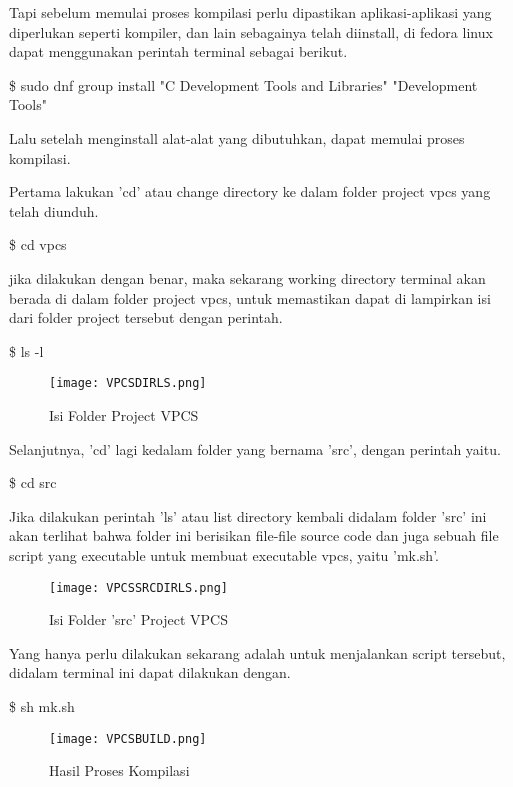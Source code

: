 \documentclass[12pt, a4paper]{article}
\begin{document}
\begin{enumerate}[label=\arabic*.]
          Tapi sebelum memulai proses kompilasi perlu dipastikan aplikasi-aplikasi
          yang diperlukan seperti kompiler, dan lain sebagainya telah diinstall,
          di fedora linux dapat menggunakan perintah terminal sebagai berikut.

          \$ sudo dnf group install "C Development Tools and Libraries" "Development Tools"

          Lalu setelah menginstall alat-alat yang dibutuhkan, dapat memulai
          proses kompilasi.

          Pertama lakukan 'cd' atau change directory ke dalam folder project
          vpcs yang telah diunduh.

          \$ cd vpcs

          jika dilakukan dengan benar, maka sekarang working directory terminal
          akan berada di dalam folder project vpcs, untuk memastikan dapat
          di lampirkan isi dari folder project tersebut dengan perintah.

          \$ ls -l

          \begin{figure}[h]
              \centering
              \texttt{[image: VPCSDIRLS.png]}
              \caption{\small{Isi Folder Project VPCS}}
          \end{figure}


          Selanjutnya, 'cd' lagi kedalam folder yang bernama 'src', dengan perintah
          yaitu.

          \$ cd src

          Jika dilakukan perintah 'ls' atau list directory kembali didalam
          folder 'src' ini akan terlihat bahwa folder ini berisikan file-file
          source code dan juga sebuah file script yang executable untuk membuat
          executable vpcs, yaitu 'mk.sh'.


          \begin{figure}[h]
              \centering
              \texttt{[image: VPCSSRCDIRLS.png]}
              \caption{\small{Isi Folder 'src' Project VPCS}}
          \end{figure}


          Yang hanya perlu dilakukan sekarang adalah untuk menjalankan
          script tersebut, didalam terminal ini dapat dilakukan dengan.

          \$ sh mk.sh

          \begin{figure}[h]
              \centering
              \texttt{[image: VPCSBUILD.png]}
              \caption{\small{Hasil Proses Kompilasi}}
          \end{figure}


\end{enumerate}
\end{document}
